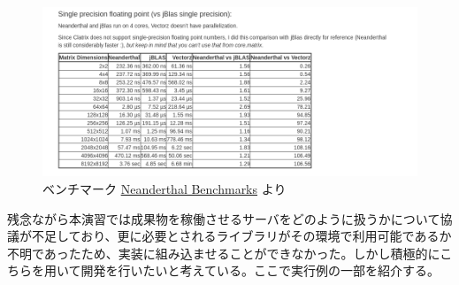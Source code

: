\documentclass{scrartcl}
\begin{document}
\begin{figure}[htbp]
\centering
\includegraphics[width=15cm]{./neanderthal.png}
\caption{ベンチマーク \href{http://neanderthal.uncomplicate.org/articles/benchmarks.html}{Neanderthal Benchmarks} より}
\end{figure}

\newpage
残念ながら本演習では成果物を稼働させるサーバをどのように扱うかについて協議が不足しており、更に必要とされるライブラリがその環境で利用可能であるか不明であったため、実装に組み込ませることができなかった。しかし積極的にこちらを用いて開発を行いたいと考えている。ここで実行例の一部を紹介する。\\
\end{document}
